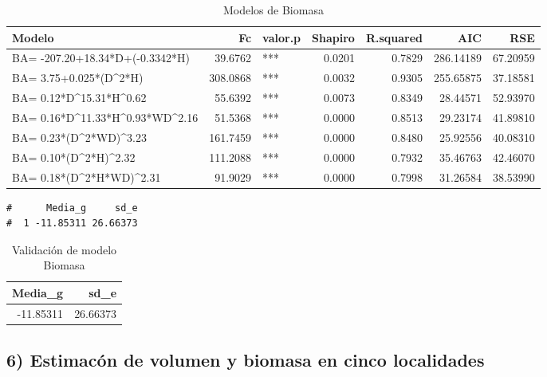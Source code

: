\documentclass[9pt,onecolumn,twoside,]{pinp}
\begin{document}
\begin{table}

\caption{\label{tab:unnamed-chunk-24}Modelos de Biomasa}
\centering
\begin{tabular}[t]{l|r|l|r|r|r|r}
\hline
Modelo & Fc & valor.p & Shapiro & R.squared & AIC & RSE\\
\hline
BA= -207.20+18.34*D+(-0.3342*H) & 39.6762 & *** & 0.0201 & 0.7829 & 286.14189 & 67.20959\\
\hline
BA= 3.75+0.025*(D\textasciicircum{}2*H) & 308.0868 & *** & 0.0032 & 0.9305 & 255.65875 & 37.18581\\
\hline
BA= 0.12*D\textasciicircum{}15.31*H\textasciicircum{}0.62 & 55.6392 & *** & 0.0073 & 0.8349 & 28.44571 & 52.93970\\
\hline
BA= 0.16*D\textasciicircum{}11.33*H\textasciicircum{}0.93*WD\textasciicircum{}2.16 & 51.5368 & *** & 0.0000 & 0.8513 & 29.23174 & 41.89810\\
\hline
BA= 0.23*(D\textasciicircum{}2*WD)\textasciicircum{}3.23 & 161.7459 & *** & 0.0000 & 0.8480 & 25.92556 & 40.08310\\
\hline
BA= 0.10*(D\textasciicircum{}2*H)\textasciicircum{}2.32 & 111.2088 & *** & 0.0000 & 0.7932 & 35.46763 & 42.46070\\
\hline
BA= 0.18*(D\textasciicircum{}2*H*WD)\textasciicircum{}2.31 & 91.9029 & *** & 0.0000 & 0.7998 & 31.26584 & 38.53990\\
\hline
\end{tabular}
\end{table}

\begin{ShadedResult}
\begin{verbatim}
#      Media_g     sd_e
#  1 -11.85311 26.66373
\end{verbatim}
\end{ShadedResult}
\begin{table}

\caption{\label{tab:unnamed-chunk-25}Validación de modelo Biomasa}
\centering
\begin{tabular}[t]{r|r}
\hline
Media\_g & sd\_e\\
\hline
-11.85311 & 26.66373\\
\hline
\end{tabular}
\end{table}

\hypertarget{estimacuxf3n-de-volumen-y-biomasa-en-cinco-localidades}{%
\subsection{6) Estimacón de volumen y biomasa en cinco
localidades}\label{estimacuxf3n-de-volumen-y-biomasa-en-cinco-localidades}}
\end{document}
